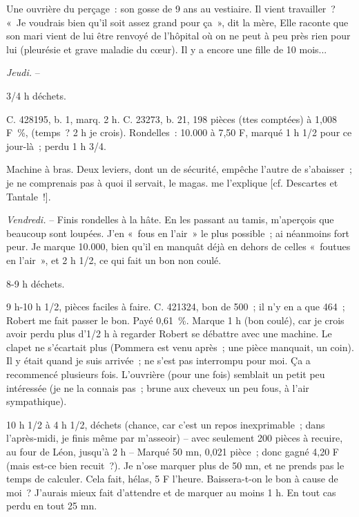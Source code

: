 \documentclass[french,twoside]{book} %
\begin{document}
Une ouvrière du perçage : son gosse de 9 ans au vestiaire. Il vient travailler ? « Je voudrais bien qu'il soit assez grand pour ça », dit la mère, Elle raconte que son mari vient de lui être renvoyé de l'hôpital où on ne peut à peu près rien pour lui (pleurésie et grave maladie du cœur). Il y a encore une fille de 10 mois...\par
{\itshape Jeudi.} –\par
3/4 h déchets.\par
C. 428195, b. 1, marq. 2 h. C. 23273, b. 21, 198 pièces (ttes comptées) à 1,008 F \%, (temps ? 2 h je crois). Rondelles : 10.000 à 7,50 F, marqué 1 h 1/2 pour ce jour-là ; perdu 1 h 3/4.\par
Machine à bras. Deux leviers, dont un de sécurité, empêche l'autre de s'abaisser ; je ne comprenais pas à quoi il servait, le magas. me l'explique [cf. Descartes et Tantale !].\par
{\itshape Vendredi.} – Finis rondelles à la hâte. En les passant au tamis, m'aperçois que beaucoup sont loupées. J'en « fous en l'air » le plus possible ; ai néanmoins fort peur. Je marque 10.000, bien qu'il en manquât déjà en dehors de celles « foutues en l'air », et 2 h 1/2, ce qui fait un bon non coulé.\par
8-9 h déchets.\par
9 h-10 h 1/2, pièces faciles à faire. C. 421324, bon de 500 ; il n'y en a que 464 ; Robert me fait passer le bon. Payé 0,61 \%. Marque 1 h (bon coulé), car je crois avoir perdu plus d'1/2 h à regarder Robert se débattre avec une machine. Le clapet ne s'écartait plus (Pommera est venu après ; une pièce manquait, un coin). Il y était quand je suis arrivée ; ne s'est pas interrompu pour moi. Ça a recommencé plusieurs fois. L'ouvrière (pour une fois) semblait un petit peu intéressée (je ne la connais pas ; brune aux cheveux un peu fous, à l'air sympathique).\par
10 h 1/2 à 4 h 1/2, déchets (chance, car c'est un repos inexprimable ; dans l'après-midi, je finis même par m'asseoir) – avec seulement 200 pièces à recuire, au four de Léon, jusqu'à 2 h – Marqué 50 mn, 0,021 pièce ; donc gagné 4,20 F (mais est-ce bien recuit ?). Je n'ose marquer plus de 50 mn, et ne prends pas le temps de calculer. Cela fait, hélas, 5 F l'heure. Baissera-t-on le bon à cause de moi ? J'aurais mieux fait d'attendre et de marquer au moins 1 h. En tout cas perdu en tout 25 mn.\par
\end{document}
